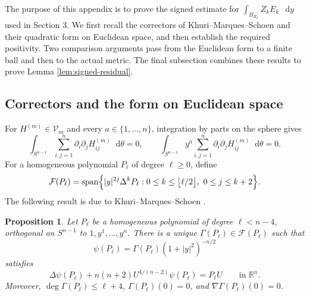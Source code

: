 \documentclass[11pt]{article}
\numberwithin{equation}{section}
\newtheorem{proposition}[theorem]{Proposition}
\theoremstyle{remark}
\newcommand{\R}{\mathbb R}
\newcommand{\Sph}{S}
\newcommand{\dd}{\mathop{}\!\mathrm{d}}
\begin{document}
{
The purpose of this appendix is to prove the signed estimate for \(\int_{B_{R_k}}Z_kE_k\,\dd y\)
used in Section  3.  We first recall the correctors of
Khuri--Marques--Schoen and their quadratic form on Euclidean space, and then
establish the required positivity.  Two
comparison arguments pass from the Euclidean form to a finite ball and then
to the actual metric.  The final subsection combines these results to prove
Lemma  \ref{lem:signed-residual}.
}

\subsection*{Correctors and the form on Euclidean space}

For $H^{(m)}\in\mathcal V_m$ and every
$a\in\{1,\ldots,n\}$, integration by parts on the sphere gives
{
\begin{equation}\label{eq:appendix-moments}
 \int_{\Sph^{n-1}}\sum_{i,j=1}^n
 \partial_i\partial_jH_{ij}^{(m)}\dd\theta=0,
 \qquad
 \int_{\Sph^{n-1}}y^a\sum_{i,j=1}^n
 \partial_i\partial_jH_{ij}^{(m)}\dd\theta=0.
\end{equation}
}
For a homogeneous polynomial \(P_\ell\) of degree \(\ell\ge0\), define
{
\begin{equation*}
 \mathcal F(P_\ell)
 =\operatorname{span}\Bigl\{
 |y|^{2j}\Delta^kP_\ell:
 0\le k\le\bigl\lfloor\ell/2\bigr\rfloor,
 \ 0\le j\le k+2\Bigr\}.
\end{equation*}
}
The following result is due to
Khuri--Marques--Schoen \cite[Proposition  4.1]{KMS}.

 \begin{proposition}\label{prop:kms-corrector}
Let \(P_\ell\) be a homogeneous polynomial of degree \(\ell<n-4\),
orthogonal on \(\Sph^{n-1}\) to \(1,y^1,\ldots,y^n\). There is a unique
\(\Gamma(P_\ell)\in\mathcal F(P_\ell)\) such that
{
\begin{equation*}
 \psi(P_\ell)=\Gamma(P_\ell)(1+|y|^2)^{-n/2}
\end{equation*}
}
 satisfies
{
\begin{equation*}
 \Delta\psi(P_\ell)+n(n+2)U^{4/(n-2)}\psi(P_\ell)=P_\ell U
 \qquad\text{in }\R^n.
\end{equation*}
}
Moreover, \(\deg\Gamma(P_\ell)\le\ell+4\),
\(\Gamma(P_\ell)(0)=0\), and \(\nabla\Gamma(P_\ell)(0)=0\).
\end{proposition}
\end{document}
